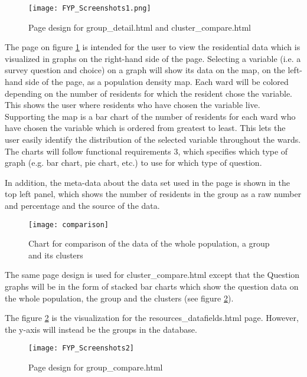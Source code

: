 \begin{figure}[h]
\centering
\texttt{[image: FYP\_Screenshots1.png]}
\caption{Page design for group\_detail.html and cluster\_compare.html}
\label{fig:FYP_Screenshots1}
\end{figure}

The page on figure \ref{fig:FYP_Screenshots1} is intended for the user to view the residential data which is visualized in graphs on the right-hand side of the page. Selecting a variable (i.e. a survey question and choice) on a graph will show its data on the map, on the left-hand side of the page, as a population density map. Each ward will be colored depending on the number of residents for which the resident chose the variable. This shows the user where residents who have chosen the variable live. Supporting the map is a bar chart of the number of residents for each ward who have chosen the variable which is ordered from greatest to least. This lets the user easily identify the distribution of the selected variable throughout the wards. The charts will follow functional requirements 3, which specifies which type of graph (e.g. bar chart, pie chart, etc.) to use for which type of question.\par

In addition, the meta-data about the data set used in the page is shown in the top left panel, which shows the number of residents in the group as a raw number and percentage and the source of the data.

\begin{figure}[h]
\centering
\texttt{[image: comparison]}
\caption{Chart for comparison of the data of the whole population, a group and its clusters}
\label{fig:comparison}
\end{figure}

The same page design is used for cluster\_compare.html except that the Question graphs will be in the form of stacked bar charts which show the question data on the whole population, the group and the clusters (see figure \ref{fig:comparison}). \par

The figure \ref{fig:comparison} is the visualization for the resources\_datafields.html page. However, the y-axis will instead be the groups in the database.

\begin{figure}[h]
\centering
\texttt{[image: FYP\_Screenshots2]}
\caption{Page design for group\_compare.html}
\label{fig:FYP_Screenshots2}
\end{figure}

